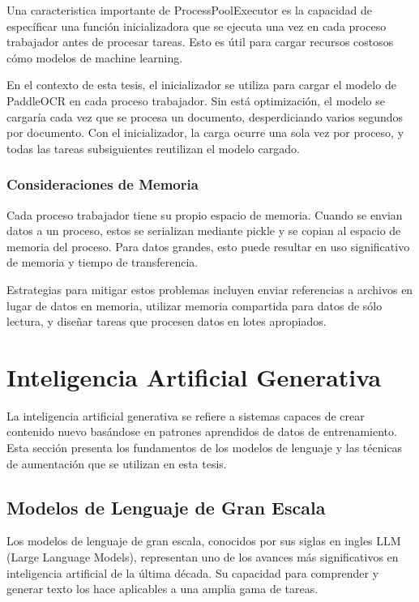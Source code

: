 \documentclass[12pt,a4paper,twoside]{book}
\begin{document}
Una caracteristica importante de ProcessPoolExecutor es la capacidad de específicar una función inicializadora que se ejecuta una vez en cada proceso trabajador antes de procesar tareas. Esto es útil para cargar recursos costosos cómo modelos de machine learning.

En el contexto de esta tesis, el inicializador se utiliza para cargar el modelo de PaddleOCR en cada proceso trabajador. Sin está optimización, el modelo se cargaría cada vez que se procesa un documento, desperdiciando varios segundos por documento. Con el inicializador, la carga ocurre una sola vez por proceso, y todas las tareas subsiguientes reutilizan el modelo cargado.

\subsubsection{Consideraciones de Memoria}

Cada proceso trabajador tiene su propio espacio de memoria. Cuando se envian datos a un proceso, estos se serializan mediante pickle y se copian al espacio de memoria del proceso. Para datos grandes, esto puede resultar en uso significativo de memoria y tiempo de transferencia.

Estrategias para mitigar estos problemas incluyen enviar referencias a archivos en lugar de datos en memoria, utilizar memoria compartida para datos de sólo lectura, y diseñar tareas que procesen datos en lotes apropiados.

\section{Inteligencia Artificial Generativa}

La inteligencia artificial generativa se refiere a sistemas capaces de crear contenido nuevo basándose en patrones aprendidos de datos de entrenamiento. Esta sección presenta los fundamentos de los modelos de lenguaje y las técnicas de aumentación que se utilizan en esta tesis.

\subsection{Modelos de Lenguaje de Gran Escala}

Los modelos de lenguaje de gran escala, conocidos por sus siglas en ingles LLM (Large Language Models), representan uno de los avances más significativos en inteligencia artificial de la última década. Su capacidad para comprender y generar texto los hace aplicables a una amplia gama de tareas.
\end{document}
